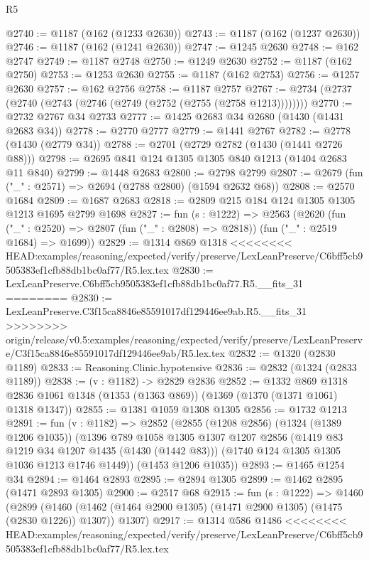 \begin{lexlean}{R5}
\begin{coremodule}
{{{{{{{{{{{{{{{{{{{{{{{{{{{{{{{{{{{{{{{{{{{{{{{{{{{{{{{{{{{{{{{{{{{{{{{{{{{{{{{{{{{{@2740 := @1187 (@162 (@1233 @2630))
@2743 := @1187 (@162 (@1237 @2630))
@2746 := @1187 (@162 (@1241 @2630))
@2747 := @1245 @2630
@2748 := @162 @2747
@2749 := @1187 @2748
@2750 := @1249 @2630
@2752 := @1187 (@162 @2750)
@2753 := @1253 @2630
@2755 := @1187 (@162 @2753)
@2756 := @1257 @2630
@2757 := @162 @2756
@2758 := @1187 @2757
@2767 := @2734 (@2737 (@2740 (@2743 (@2746 (@2749 (@2752 (@2755 (@2758 @1213))))))))
@2770 := @2732 @2767 @34 @2733
@2777 := @1425 @2683 @34 @2680 (@1430 (@1431 @2683 @34))
@2778 := @2770 @2777
@2779 := @1441 @2767
@2782 := @2778 (@1430 (@2779 @34))
@2788 := @2701 (@2729 @2782 (@1430 (@1441 @2726 @88)))
@2798 := @2695 @841 @124 @1305 @1305 @840 @1213 (@1404 @2683 @11 @840)
@2799 := @1448 @2683
@2800 := @2798 @2799
@2807 := @2679 (fun ("_" : @2571) => @2694 (@2788 @2800) (@1594 @2632 @68))
@2808 := @2570 @1684
@2809 := @1687 @2683
@2818 := @2809 @215 @184 @124 @1305 @1305 @1213 @1695 @2799 @1698
@2827 := fun (s : @1222) =>
  @2563
    (@2620
      (fun ("_" : @2520) => @2807 (fun ("_" : @2808) => @2818))
      (fun ("_" : @2519 @1684) => @1699))
@2829 := @1314 @869 @1318
<<<<<<<< HEAD:examples/reasoning/expected/verify/preserve/LexLeanPreserve/C6bff5cb9505383ef1cfb88db1bc0af77/R5.lex.tex
@2830 := LexLeanPreserve.C6bff5cb9505383ef1cfb88db1bc0af77.R5.__fits_31
========
@2830 := LexLeanPreserve.C3f15ca8846e85591017df129446ee9ab.R5.__fits_31
>>>>>>>> origin/release/v0.5:examples/reasoning/expected/verify/preserve/LexLeanPreserve/C3f15ca8846e85591017df129446ee9ab/R5.lex.tex
@2832 := @1320 (@2830 @1189)
@2833 := Reasoning.Clinic.hypotensive
@2836 := @2832 (@1324 (@2833 @1189))
@2838 := (v : @1182) -> @2829 @2836
@2852 := @1332
    @869
    @1318
    @2836
    @1061
    @1348
    (@1353 (@1363 @869))
    (@1369 (@1370 (@1371 @1061) @1318 @1347))
@2855 := @1381 @1059 @1308 @1305
@2856 := @1732 @1213
@2891 := fun (v : @1182) =>
  @2852
    (@2855
      (@1208 @2856)
      (@1324 (@1389 @1206 @1035))
      (@1396
        @789
        @1058
        @1305
        @1307
        @1207
        @2856
        (@1419 @83 @1219 @34 @1207 @1435 (@1430 (@1442 @83)))
        (@1740 @124 @1305 @1305 @1036 @1213 @1746 @1449))
      (@1453 @1206 @1035))
@2893 := @1465 @1254 @34
@2894 := @1464 @2893
@2895 := @2894 @1305
@2899 := @1462 @2895 (@1471 @2893 @1305)
@2900 := @2517 @68
@2915 := fun (s : @1222) =>
  @1460
    (@2899
      (@1460 (@1462 (@1464 @2900 @1305) (@1471 @2900 @1305) (@1475 (@2830 @1226)) @1307))
      @1307)
@2917 := @1314 @586 @1486
<<<<<<<< HEAD:examples/reasoning/expected/verify/preserve/LexLeanPreserve/C6bff5cb9505383ef1cfb88db1bc0af77/R5.lex.tex
}}}}}}}}}}}}}}}}}}}}}}}}}}}}}}}}}}}}}}}}}}}}}}}}}}}}}}}}}}}}}}}}}}}}}}}}}}}}}}}}}}}}
\end{coremodule}
\end{lexlean}
